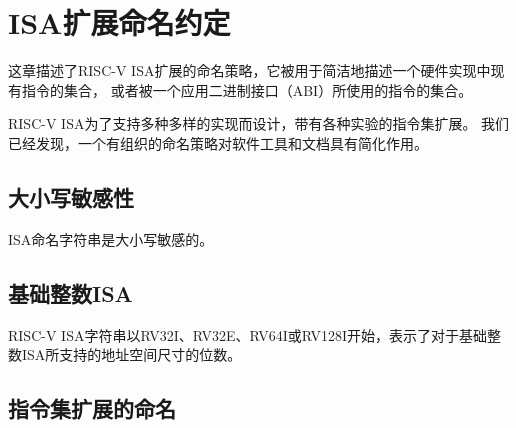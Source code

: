 \chapter{ISA扩展命名约定}
\label{naming}

这章描述了RISC-V ISA扩展的命名策略，它被用于简洁地描述一个硬件实现中现有指令的集合，
或者被一个应用二进制接口（ABI）所使用的指令的集合。

\begin{commentary}
  RISC-V ISA为了支持多种多样的实现而设计，带有各种实验的指令集扩展。
  我们已经发现，一个有组织的命名策略对软件工具和文档具有简化作用。
\end{commentary}

\section{大小写敏感性}

ISA命名字符串是大小写敏感的。

\section{基础整数ISA}
RISC-V ISA字符串以RV32I、RV32E、RV64I或RV128I开始，表示了对于基础整数ISA所支持的地址空间尺寸的位数。

\section{指令集扩展的命名}

